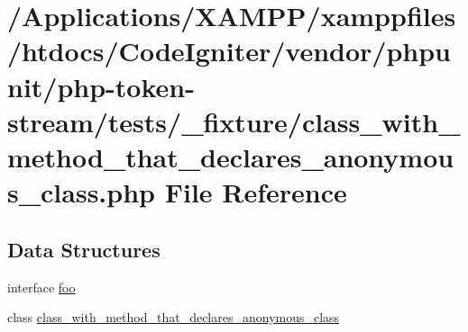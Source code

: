 \hypertarget{class__with__method__that__declares__anonymous__class_8php}{}\section{/\+Applications/\+X\+A\+M\+P\+P/xamppfiles/htdocs/\+Code\+Igniter/vendor/phpunit/php-\/token-\/stream/tests/\+\_\+fixture/class\+\_\+with\+\_\+method\+\_\+that\+\_\+declares\+\_\+anonymous\+\_\+class.php File Reference}
\label{class__with__method__that__declares__anonymous__class_8php}
\subsection*{Data Structures}
\begin{DoxyCompactItemize}
\item 
interface \mbox{\hyperlink{interfacefoo}{foo}}
\item 
class \mbox{\hyperlink{classclass__with__method__that__declares__anonymous__class}{class\+\_\+with\+\_\+method\+\_\+that\+\_\+declares\+\_\+anonymous\+\_\+class}}
\end{DoxyCompactItemize}
